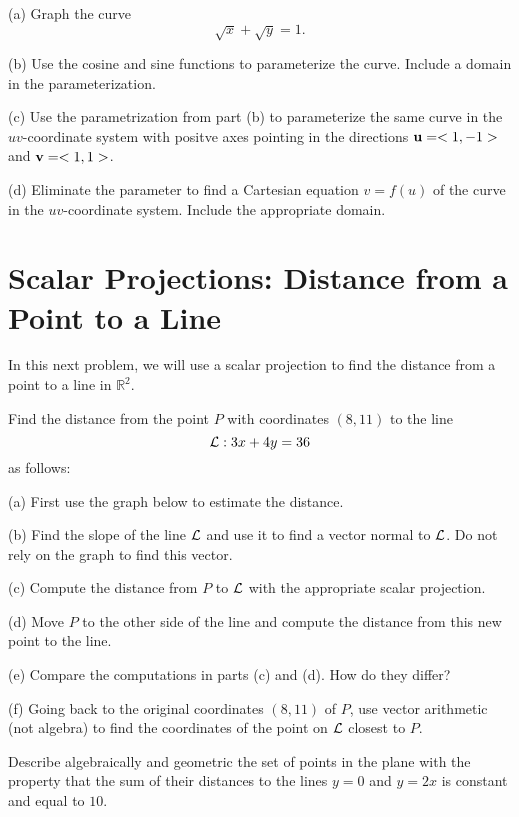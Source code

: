 \documentclass{ximera}
\begin{document}
\begin{question}  \label{Qgvbrh4:Scalar}
(a) Graph the curve
\[
  \sqrt{x} + \sqrt{y} = 1 .
\]

(b) Use the cosine and sine functions to parameterize the curve. Include a domain in the parameterization.

(c) Use the parametrization from part (b) to parameterize the same curve in the $uv$-coordinate system with positve axes pointing in the directions ${\bf u} = <1,-1>$ and ${\bf v}= <1,1>$.

(d) Eliminate the parameter to find a Cartesian equation $v=f(u)$ of the curve in the $uv$-coordinate system. Include the appropriate domain.

\end{question}



\section{Scalar Projections: Distance from a Point to a Line}
In this next problem, we will use a scalar projection to find the distance from a point to a line in $\mathbb{R}^2$.


\begin{question}   \label{Qdsfg4nvc:Scalar}
Find the distance from the point $P$ with coordinates $(8,11)$ to the line
\[
   {\cal L}: 3x + 4y = 36
\] 
as follows:

(a) First use the graph below to estimate the distance.

(b) Find the slope of the line ${\cal L}$ and use it to find a vector normal to ${\cal L}$. Do not rely on the graph to find this vector.

(c) Compute the distance from $P$ to ${\cal L}$ with the appropriate scalar projection.

(d)  Move $P$ to the other side of the line and compute the distance from this new point to the line. 

(e) Compare the computations in parts (c) and (d). How do they differ?

(f) Going back to the original coordinates $(8,11)$ of $P$, use vector arithmetic (not algebra) to find the coordinates of the point on ${\cal L}$ closest to $P$.
\begin{exploration}

 
\begin{onlineOnly}
    \begin{center}
\end{center}
\end{onlineOnly}
\end{exploration}
\end{question}


\begin{question}  \label{Qfhghhy:Scalar}
Describe algebraically and geometric the set of points in the plane with the property that the sum of their distances to the lines $y=0$ and $y=2x$ is constant and equal to $10$.
\end{question}
\end{document}

